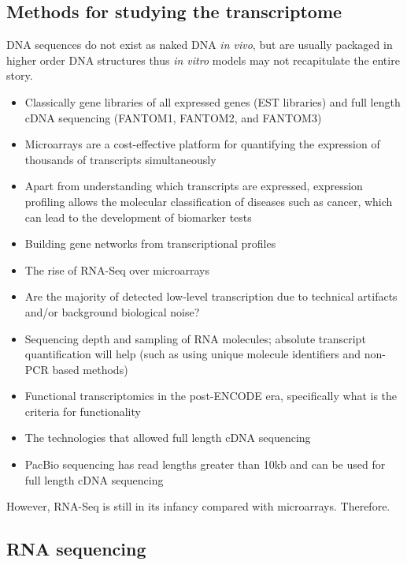 \subsection{Methods for studying the transcriptome}

DNA sequences do not exist as naked DNA \textit{in vivo}, but are usually packaged in higher order DNA structures thus \textit{in vitro} models may not recapitulate the entire story.

\begin{itemize}
   \item Classically gene libraries of all expressed genes (EST libraries) and full length cDNA sequencing (FANTOM1, FANTOM2, and FANTOM3)
   \item Microarrays are a cost-effective platform for quantifying the expression of thousands of transcripts simultaneously
   \item Apart from understanding which transcripts are expressed, expression profiling allows the molecular classification of diseases such as cancer, which can lead to the development of biomarker tests
   \item Building gene networks from transcriptional profiles
   \item The rise of RNA-Seq over microarrays
\end{itemize}

\begin{itemize}
   \item Are the majority of detected low-level transcription due to technical artifacts and/or background biological noise?
   \item Sequencing depth and sampling of RNA molecules; absolute transcript quantification will help (such as using unique molecule identifiers and non-PCR based methods)
   \item Functional transcriptomics in the post-ENCODE era, specifically what is the criteria for functionality
   \item The technologies that allowed full length cDNA sequencing
   \item PacBio sequencing has read lengths greater than 10kb and can be used for full length cDNA sequencing
\end{itemize}

However, RNA-Seq is still in its infancy compared with microarrays. Therefore.

\subsection{RNA sequencing}


